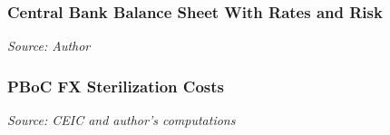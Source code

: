 \documentclass{beamer}
\begin{document}
\begin{frame}
\frametitle{Central Bank Balance Sheet With Rates and Risk}
\medskip
\emph{Source: Author}
\end{frame}


\begin{frame}
\frametitle{PBoC FX Sterilization Costs}
\medskip
\emph{Source: CEIC and author's computations}
\end{frame}
\end{document}
